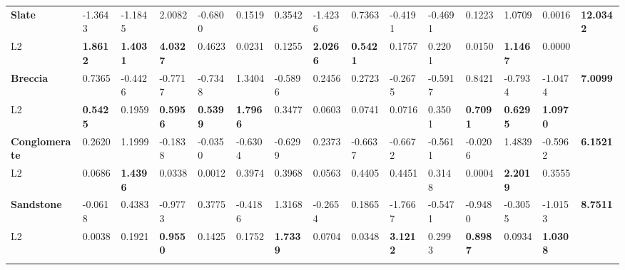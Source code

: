 \begin{landscape}
\begin{table}[]
{\begin{tabular}{@{}lllllllllllllll@{}}
\rowcolor[HTML]{E7E6E6} 
\textbf{Slate} &
  -1.3643 &
  -1.1845 &
  2.0082 &
  -0.6800 &
  0.1519 &
  0.3542 &
  -1.4236 &
  0.7363 &
  -0.4191 &
  -0.4691 &
  0.1223 &
  1.0709 &
  0.0016 &
  \textbf{12.0342} \\
L2 &
  \cellcolor[HTML]{FFC000}\textbf{1.8612} &
  \cellcolor[HTML]{FFD966}\textbf{1.4031} &
  \cellcolor[HTML]{ED7D31}\textbf{4.0327} &
  0.4623 &
  0.0231 &
  0.1255 &
  \cellcolor[HTML]{FCE4D6}\textbf{2.0266} &
  \cellcolor[HTML]{FFF2CC}\textbf{0.5421} &
  0.1757 &
  0.2201 &
  0.0150 &
  \cellcolor[HTML]{FFD966}\textbf{1.1467} &
  0.0000 &
  \textbf{} \\
\rowcolor[HTML]{E7E6E6} 
\textbf{Breccia} &
  0.7365 &
  -0.4426 &
  -0.7717 &
  -0.7348 &
  1.3404 &
  -0.5896 &
  0.2456 &
  0.2723 &
  -0.2675 &
  -0.5917 &
  0.8421 &
  -0.7934 &
  -1.0474 &
  \textbf{7.0099} \\
L2 &
  \cellcolor[HTML]{FFF2CC}\textbf{0.5425} &
  0.1959 &
  \cellcolor[HTML]{FFF2CC}\textbf{0.5956} &
  \cellcolor[HTML]{FFF2CC}\textbf{0.5399} &
  \cellcolor[HTML]{FFC000}\textbf{1.7966} &
  0.3477 &
  0.0603 &
  0.0741 &
  0.0716 &
  0.3501 &
  \cellcolor[HTML]{FFF2CC}\textbf{0.7091} &
  \cellcolor[HTML]{FFF2CC}\textbf{0.6295} &
  \cellcolor[HTML]{FFD966}\textbf{1.0970} &
  \textbf{} \\
\rowcolor[HTML]{E7E6E6} 
\textbf{Conglomerate} &
  0.2620 &
  1.1999 &
  -0.1838 &
  -0.0350 &
  -0.6304 &
  -0.6299 &
  0.2373 &
  -0.6637 &
  -0.6672 &
  -0.5611 &
  -0.0206 &
  1.4839 &
  -0.5962 &
  \textbf{6.1521} \\
L2 &
  0.0686 &
  \cellcolor[HTML]{FFD966}\textbf{1.4396} &
  0.0338 &
  0.0012 &
  0.3974 &
  0.3968 &
  0.0563 &
  0.4405 &
  0.4451 &
  0.3148 &
  0.0004 &
  \cellcolor[HTML]{FCE4D6}\textbf{2.2019} &
  0.3555 &
  \textbf{} \\
\rowcolor[HTML]{E7E6E6} 
\textbf{Sandstone} &
  -0.0618 &
  0.4383 &
  -0.9773 &
  0.3775 &
  -0.4186 &
  1.3168 &
  -0.2654 &
  0.1865 &
  -1.7667 &
  -0.5471 &
  -0.9480 &
  -0.3055 &
  -1.0153 &
  \textbf{8.7511} \\
L2 &
  0.0038 &
  0.1921 &
  \cellcolor[HTML]{FFF2CC}\textbf{0.9550} &
  0.1425 &
  0.1752 &
  \cellcolor[HTML]{FFC000}\textbf{1.7339} &
  0.0704 &
  0.0348 &
  \cellcolor[HTML]{F4B084}\textbf{3.1212} &
  0.2993 &
  \cellcolor[HTML]{FFF2CC}\textbf{0.8987} &
  0.0934 &
  \cellcolor[HTML]{FFD966}\textbf{1.0308} &
  \textbf{} \\
 &
   &
   &
   &
   &
   &
   &
   &
   &
   &
   &
   &
   &
   &
   \\

\end{tabular}}
\end{table}
\end{landscape}
